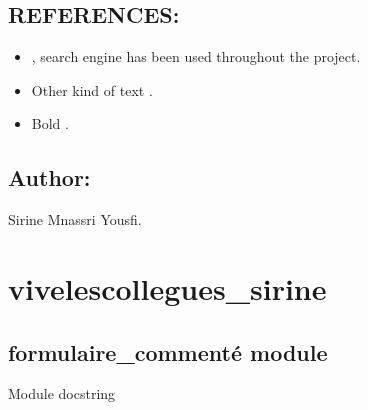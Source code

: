 \documentclass[letterpaper,10pt,french]{sphinxmanual}
\begin{document}
\section{REFERENCES:}
\label{\detokenize{introduction:references}}\begin{itemize}
\item {} 
\sphinxAtStartPar
{} , search engine has been used throughout the project.

\item {} 
\sphinxAtStartPar
Other kind of text .

\item {} 
\sphinxAtStartPar
Bold .

\end{itemize}


\section{Author:}
\label{\detokenize{introduction:author}}
\sphinxAtStartPar
Sirine Mnassri Yousfi.


\chapter{vivelescollegues\_sirine}
\label{\detokenize{modules:vivelescollegues-sirine}}\label{\detokenize{modules::doc}}

\section{formulaire\_commenté module}
\label{\detokenize{formulaire_comment_xe9:module-formulaire_commente}}\label{\detokenize{formulaire_comment_xe9:module-formulaire_comment_xe9}}\label{\detokenize{formulaire_comment_xe9:formulaire-commente-module}}\label{\detokenize{formulaire_comment_xe9::doc}}
\sphinxAtStartPar
Module docstring
\end{document}
